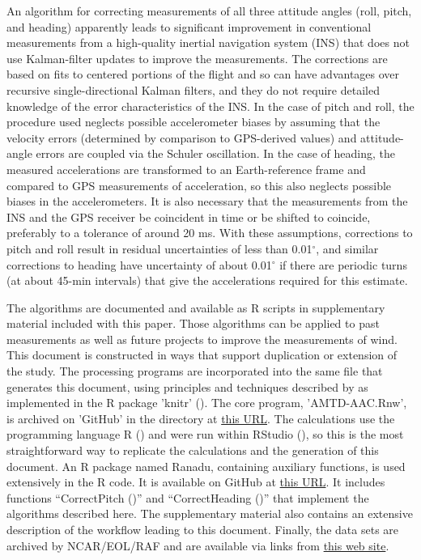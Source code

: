 \documentclass[english,british,amt,bookmarks=false,unicode=true]{copernicus}\usepackage[]{graphicx}\usepackage[]{color}
\begin{document}
An algorithm for correcting measurements of all three attitude angles
(roll, pitch, and heading) apparently leads to significant improvement
in conventional measurements from a high-quality inertial navigation
system (INS) that does not use Kalman-filter updates to improve the
measurements. The corrections are based on fits to centered portions
of the flight and so can have advantages over recursive single-directional
Kalman filters, and they do not require detailed knowledge of the
error characteristics of the INS. In the case of pitch and roll, the
procedure used neglects possible accelerometer biases by assuming
that the velocity errors (determined by comparison to GPS-derived
values) and attitude-angle errors are coupled via the Schuler oscillation.
In the case of heading, the measured accelerations are transformed
to an Earth-reference frame and compared to GPS measurements of acceleration,
so this also neglects possible biases in the accelerometers. It is
also necessary that the measurements from the INS and the GPS receiver
be coincident in time or be shifted to coincide, preferably to a tolerance
of around 20 ms. With these assumptions, corrections to pitch and
roll result in residual uncertainties of less than 0.01$^{\circ}$,
and similar corrections to heading have uncertainty of about 0.01$^{\circ}$
if there are periodic turns (at about 45-min intervals) that give
the accelerations required for this estimate.

The algorithms are documented and available as R scripts in supplementary
material included with this paper. Those algorithms can be applied
to past measurements as well as future projects to improve the measurements
of wind. This document is constructed in ways that support duplication
or extension of the study. The processing programs are incorporated
into the same file that generates this document, using principles
and techniques described by \citet{Xie2014a} as implemented in the
R package \textquoteright knitr\textquoteright{} (\citet{Xie2014b}).
The core program, \textquoteright AMTD-AAC.Rnw\textquoteright , is
archived on \textquoteright GitHub\textquoteright{} in the directory
at \href{https://WilliamCooper/AMTD-AAC.git}{this URL}. The calculations
use the programming language R (\citet{Rlanguage}) and were run within
RStudio (\citet{RStudio2012}), so this is the most straightforward
way to replicate the calculations and the generation of this document.
An R package named Ranadu, containing auxiliary functions, is used
extensively in the R code. It is available on GitHub at \href{https://github.com/WilliamCooper/Ranadu.git}{this URL}.
It includes functions ``CorrectPitch ()'' and ``CorrectHeading
()'' that implement the algorithms described here. The supplementary
material also contains an extensive description of the workflow leading
to this document. Finally, the data sets are archived by NCAR/EOL/RAF
and are available via links from \href{http://www.eol.ucar.edu/all-field-projects-and-deployments}{this web site}.
\end{document}
